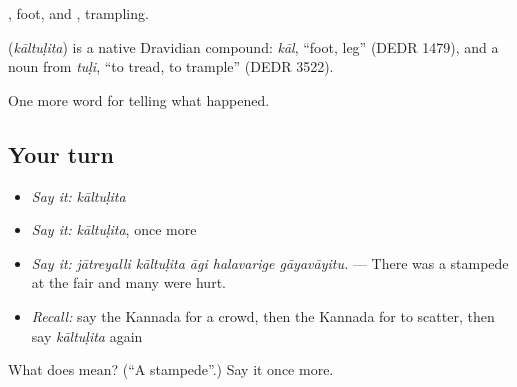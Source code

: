, foot, and , trampling.

\begin{cousinweb}
\textbf{} (\emph{kāltuḷita}) is a native Dravidian compound: \emph{kāl}, \textquotedblleft{}foot, leg\textquotedblright{} (DEDR 1479), and a noun from \emph{tuḷi}, \textquotedblleft{}to tread, to trample\textquotedblright{} (DEDR 3522).
\end{cousinweb}

\begin{grammarlens}[title={What you've built}]
One more word for telling what happened.
\end{grammarlens}

\subsection*{Your turn}
\begin{itemize}
\raggedright
  \item \emph{Say it:} \emph{kāltuḷita}
  \item \emph{Say it:} \emph{kāltuḷita}, once more
  \item \emph{Say it:} \emph{jātreyalli kāltuḷita āgi halavarige gāyavāyitu.} — There was a stampede at the fair and many were hurt.
  \item \emph{Recall:} say the Kannada for a crowd, then the Kannada for to scatter, then say \emph{kāltuḷita} again
\end{itemize}

\begin{tcolorbox}[breakable,colback=teal!4,colframe=teal!35!black,title={Before you move on}]
What does  mean? (\textquotedblleft{}A stampede\textquotedblright{}.) Say it once more.
\end{tcolorbox}
